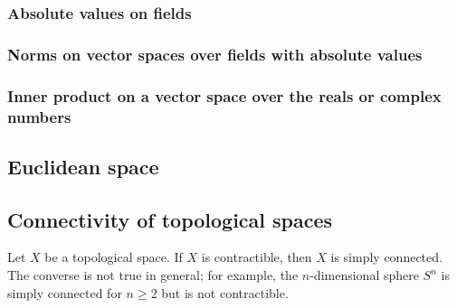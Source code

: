 \subsubsection{Absolute values on fields}


\subsubsection{Norms on vector spaces over fields with absolute values}



\subsubsection{Inner product on a vector space over the reals or complex numbers}



\subsection{Euclidean space}



\subsection{Connectivity of topological spaces}







\begin{proposition}
    \TODO{}
Let $X$ be a topological space. If $X$ is contractible, then $X$ is simply connected. The converse is not true in general; for example, the $n$-dimensional sphere $S^n$ is simply connected for $n \geq 2$ but is not contractible.
\end{proposition}

